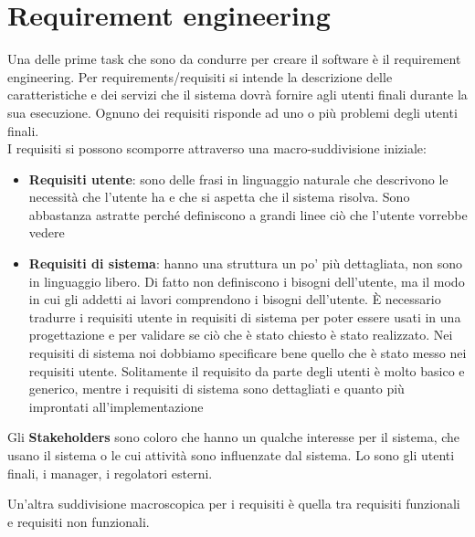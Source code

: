 \section{Requirement engineering}
\label{sec:04_requirement_engineering}
Una delle prime task che sono da condurre per creare il software è il requirement engineering.
Per requirements/requisiti si intende la descrizione delle caratteristiche e dei servizi che il sistema dovrà fornire agli utenti finali durante la sua esecuzione.
Ognuno dei requisiti risponde ad uno o più problemi degli utenti finali.\\
I requisiti si possono scomporre attraverso una macro-suddivisione iniziale:
\begin{itemize}[noitemsep]
    \item \textbf{Requisiti utente}: sono delle frasi in linguaggio naturale che descrivono le necessità che l'utente ha e che si aspetta che il sistema risolva. Sono abbastanza astratte perché definiscono a grandi linee ciò che l'utente vorrebbe vedere
    \item \textbf{Requisiti di sistema}: hanno una struttura un po' più dettagliata, non sono in linguaggio libero. Di fatto non definiscono i bisogni dell'utente, ma il modo in cui gli addetti ai lavori comprendono i bisogni dell'utente. È necessario tradurre i requisiti utente in requisiti di sistema per poter essere usati in una progettazione e per validare se ciò che è stato chiesto è stato realizzato. Nei requisiti di sistema noi dobbiamo specificare bene quello che è stato messo nei requisiti utente. Solitamente il requisito da parte degli utenti è molto basico e generico, mentre i requisiti di sistema sono dettagliati e quanto più improntati all'implementazione
\end{itemize}
Gli \textbf{Stakeholders} sono coloro che hanno un qualche interesse per il sistema, che usano il sistema o le cui attività sono influenzate dal sistema. Lo sono gli utenti finali, i manager, i regolatori esterni.

Un'altra suddivisione macroscopica per i requisiti è quella tra requisiti funzionali e requisiti non funzionali.
